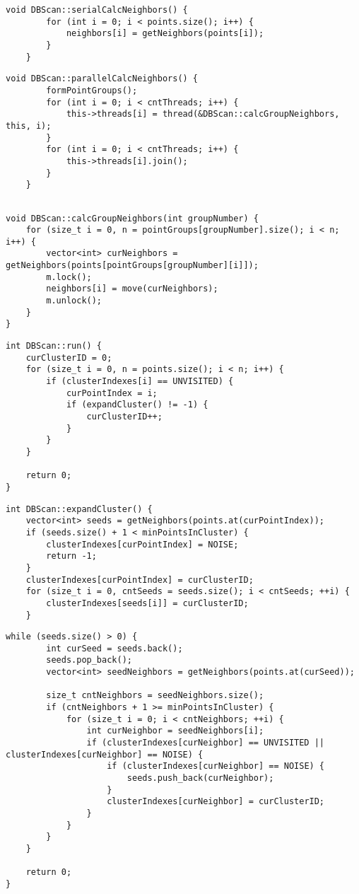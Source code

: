 \begin{lstlisting}[label=lst:serialCalcNeighbors,caption=Функция последовательного вычисления соседей]
	void DBScan::serialCalcNeighbors() {
		for (int i = 0; i < points.size(); i++) {
			neighbors[i] = getNeighbors(points[i]);
		}
	}
\end{lstlisting}

\begin{lstlisting}[label=lst:parallelCalcNeighbors,caption=Функция параллельного вычисления соседей: основной поток]
	void DBScan::parallelCalcNeighbors() {
		formPointGroups();
		for (int i = 0; i < cntThreads; i++) {
			this->threads[i] = thread(&DBScan::calcGroupNeighbors, this, i);
		}
		for (int i = 0; i < cntThreads; i++) {
			this->threads[i].join();
		}
	}
	
\end{lstlisting}

\begin{lstlisting}[label=lst:calcGroupNeighbors,caption=Функция параллельного вычисления соседей: вспомогательные потоки]
void DBScan::calcGroupNeighbors(int groupNumber) {
	for (size_t i = 0, n = pointGroups[groupNumber].size(); i < n; i++) {
		vector<int> curNeighbors = getNeighbors(points[pointGroups[groupNumber][i]]);
		m.lock();
		neighbors[i] = move(curNeighbors);
		m.unlock();
	}
}
\end{lstlisting}

\begin{lstlisting}[label=lst:run,caption=Основная функция алгоритма]
int DBScan::run() {
	curClusterID = 0;
	for (size_t i = 0, n = points.size(); i < n; i++) {
		if (clusterIndexes[i] == UNVISITED) {
			curPointIndex = i;
			if (expandCluster() != -1) {
				curClusterID++;
			}
		}
	}
	
	return 0;
}
\end{lstlisting}

\begin{lstlisting}[label=lst:expandCluster,caption=Функция expandCluster (часть 1)]
int DBScan::expandCluster() {
	vector<int> seeds = getNeighbors(points.at(curPointIndex));
	if (seeds.size() + 1 < minPointsInCluster) {
		clusterIndexes[curPointIndex] = NOISE;
		return -1;
	}
	clusterIndexes[curPointIndex] = curClusterID;
	for (size_t i = 0, cntSeeds = seeds.size(); i < cntSeeds; ++i) {
		clusterIndexes[seeds[i]] = curClusterID;
	}
\end{lstlisting}

\begin{lstlisting}[label=lst:expandCluster2,caption=Функция expandCluster (часть 2)]
	while (seeds.size() > 0) {
		int curSeed = seeds.back();
		seeds.pop_back();
		vector<int> seedNeighbors = getNeighbors(points.at(curSeed));
		
		size_t cntNeighbors = seedNeighbors.size();
		if (cntNeighbors + 1 >= minPointsInCluster) {
			for (size_t i = 0; i < cntNeighbors; ++i) {
				int curNeighbor = seedNeighbors[i];
				if (clusterIndexes[curNeighbor] == UNVISITED || clusterIndexes[curNeighbor] == NOISE) {
					if (clusterIndexes[curNeighbor] == NOISE) {
						seeds.push_back(curNeighbor);
					}
					clusterIndexes[curNeighbor] = curClusterID;
				}
			}
		}
	}
	
	return 0;
}
\end{lstlisting}

